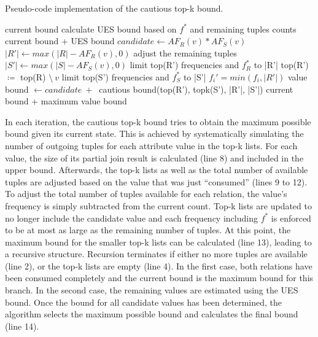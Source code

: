 \begin{algorithm}[tb]
    \caption{Pseudo-code implementation of the cautious top-k bound.}
    \label{alg:cautious-topk-bound}
    \begin{algorithmic}[1]
                \State \Return current bound
            \EndIf
                \State calculate UES bound based on $f^*$ and remaining tuples counts
                \State \Return current bound + UES bound
            \EndIf
                \State $candidate \gets AF_R(v) * AF_S(v)$
                \State $|R'| \gets max(|R| - AF_R(v), 0)$ \Comment adjust the remaining tuples
                \State $|S'| \gets max(|S| - AF_S(v), 0)$
                \State limit top(R') frequencies and $f^\ast_R$ to |R'| \Comment top(R') $\coloneqq$ top(R) $\setminus\:v$
                \State limit top(S') frequencies and $f^\ast_S$ to |S'| \Comment $f_i' = min(f_i, |R'|)$
                \State value bound $\gets candidate\:+\:$ cautious bound(top(R'), topk(S'), |R'|, |S'|) 
            \EndFor
            \State \Return current bound + maximum value bound
        \EndFunction
    \end{algorithmic}
\end{algorithm}

In each iteration, the cautious top-k bound tries to obtain the maximum possible bound given its current state. 
This is achieved by systematically simulating the number of outgoing tuples for each attribute value in the top-k lists. 
For each value, the size of its partial join result is calculated (line 8) and included in the upper bound. 
Afterwards, the top-k lists as well as the total number of available tuples are adjusted based on the value that was just ``consumed'' (lines 9 to 12). 
To adjust the total number of tuples available for each relation, the value's frequency is simply subtracted from the current count. 
Top-k lists are updated to no longer include the candidate value and each frequency including $f^\ast$ is enforced to be at most as large as the remaining number of tuples. 
At this point, the maximum bound for the smaller top-k lists can be calculated (line 13), leading to a recursive structure. 
Recursion terminates if either no more tuples are available (line 2), or the top-k lists are empty (line 4). 
In the first case, both relations have been consumed completely and the current bound is the maximum bound for this branch. 
In the second case, the remaining values are estimated using the UES bound. 
Once the bound for all candidate values has been determined, the algorithm selects the maximum possible bound and calculates the final bound (line 14).

